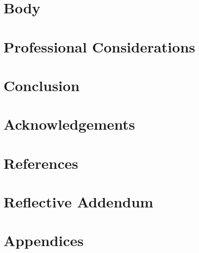 \documentclass{article}
\begin{document}
\begin{multicols}{2}
\section{Body}

\section{Professional Considerations}

\section{Conclusion}

\section{Acknowledgements}

\section{References}

\section{Reflective Addendum}

\section{Appendices}

\end{multicols}

\medskip

\printbibliography
\end{document}
